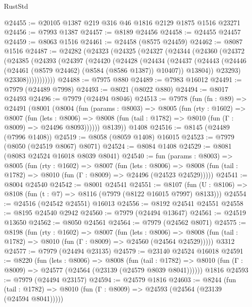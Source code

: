 \begin{lexlean}{RustStd}
\begin{coremodule}
@24455 := @20105 @1387 @219 @316 @46 @1816 @2129 @1875 @1516 @23271
@24456 := @7993 @1387
@24457 := @8189 @24456
@24458 := @24455 @24457
@24459 := @8063 @1516
@24461 := @24458 (@8575 @24459)
@24462 := @8087 @1516
@24487 := @24282
    (@24323
      (@24325
        (@24327
          (@24344
            (@24360
              (@24372
                (@24385
                  (@24393
                    (@24397
                      (@24420
                        (@24428
                          (@24434
                            (@24437
                              (@24443
                                (@24446 (@24461 (@8579 @24462) (@8584 (@8586 @1387)) @10407))
                                @13804))
                            @23293)
                          @23308)))))))))))
@24488 := @7975 @880
@24489 := @7983 @16012
@24491 := @7979 (@24489 @7998)
@24493 := @8021 (@8022 @880)
@24494 := @8017 @24493
@24496 := @7979 (@24494 @8046)
@24513 := @7978
    (fun (fn : @89) =>
    @24491
      (@8001
        (@8004
          (fun (params : @8003) =>
          @8005
            (fun (rty : @1602) =>
            @8007
              (fun (lets : @8006) =>
              @8008 (fun (tail : @1782) => @8010 (fun (Γ : @8009) => @24496 @8093))))))
        @8139))
    @1408
@24516 := @8145 (@24489 (@7996 @1408))
@24519 := @8058 (@8059 @1408) @16015
@24523 := @7979 (@8050 (@24519 @8067) @8071)
@24524 := @8084 @1408
@24529 := @8081 (@8083 @24524 @16018 @8039 @8041)
@24540 := fun (params : @8003) =>
  @8005
    (fun (rty : @1602) =>
    @8007
      (fun (lets : @8006) =>
      @8008 (fun (tail : @1782) => @8010 (fun (Γ : @8009) => @24496 (@24523 @24529)))))
@24541 := @8004 @24540
@24542 := @8001 @24541
@24551 := @8107
    (fun (U : @8106) => @8108 (fun (t : @7) => @8116 (@7979 (@8122 @16015 @7997) @8133)))
@24554 := @24516 (@24542 @24551) @16013
@24556 := @8192 @24541 @24551
@24558 := @8195 @24540 @2942
@24560 := @7979 (@24494 @13647)
@24561 := @24519 @13650
@24562 := @8050 @24561
@24564 := @7979 (@24562 @8071)
@24575 := @8198
    (fun (rty : @1602) =>
    @8007
      (fun (lets : @8006) =>
      @8008 (fun (tail : @1782) => @8010 (fun (Γ : @8009) => @24560 (@24564 @24529)))))
    @3312
@24577 := @7979 (@24494 @23135)
@24579 := @23140 @24524 @16018
@24591 := @8220
    (fun (lets : @8006) =>
    @8008
      (fun (tail : @1782) =>
      @8010 (fun (Γ : @8009) => @24577 (@24564 (@23139 (@24579 @8039 @8041))))))
    @1816
@24593 := @7979 (@24494 @23157)
@24594 := @24579 @1816
@24603 := @8244
    (fun (tail : @1782) => @8010 (fun (Γ : @8009) => @24593 (@24564 (@23139 (@24594 @8041)))))

\end{coremodule}
\end{lexlean}
